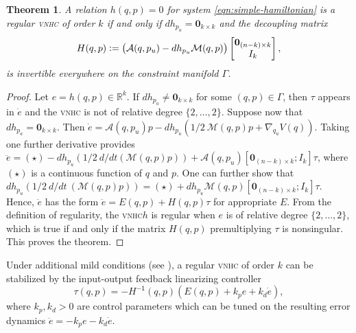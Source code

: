 \documentclass[journal,twoside,web, twocolumn,draftcls]{ieeecolor}
\newtheorem{thm}{Theorem}%
\newcommand*{\inv}{^\mathsf{-1}}
\newcommand*{\R}{\mathbb{R}}
\newcommand*{\Id}[1]{I_{#1}}
\newcommand*{\Zmat}[1]{\bm{0}_{#1}}
\newcommand*{\simpleB}{\begin{bmatrix}\Zmat{(n-k)\times k}\\ \Id{k}\end{bmatrix}}
\newcommand*{\eqdef}{\vcentcolon=}
\newcommand*{\vnhc}{\textsc{vnhc}\xspace}
\begin{document}
\begin{thm}\label{thm:vnhc-regularity}
    A relation \(h(q,p) = 0\) for system \eqref{eqn:simple-hamiltonian}
    is a regular \vnhc of order \(k\) if and only if 
    \(dh_{p_a} = \Zmat{k \times k}\) 
    and the decoupling matrix
    \begin{equation}\label{eqn:decoupling-matrix}
        H(q,p) \eqdef \big(\mathcal{A}(q,p_u) - dh_{p_u}\mathcal{M}(q,p)\big)\simpleB
         ,
     \end{equation}
    is invertible everywhere on the constraint manifold \(\Gamma\).
\end{thm}
\begin{proof}
    Let \(e = h(q,p) \in \R^k\).
    If \(dh_{p_a} \neq \Zmat{k\times k}\) for some \((q,p) \in \Gamma\), 
    then \(\tau\) appears in \(\dot{e}\) and the \vnhc is not of relative degree
    \(\{2,\ldots,2\}\). Suppose now that \(dh_{p_a} = \Zmat{k\times k}\).
    Then 
    \(\dot{e} = \mathcal{A}(q,p_u)p - 
     dh_{p_u}\left(1/2~\mathcal{M}(q,p)p + \nabla_{q_u}V(q)\right)\).
    Taking one further derivative provides
    \( \ddot{e} = (\star) - 
        dh_{p_u}\left(1/2~d/dt\left(\mathcal{M}(q,p)p\right)\right) 
        + \mathcal{A}(q,p_u)[\Zmat{(n-k)\times k};\Id{k}] \tau\),
    where \((\star)\) is a continuous function of \(q\) and \(p\).
    One can further show that
    \(dh_{p_u}\left(1/2~d/dt~\left(\mathcal{M}(q,p)p\right)\right)
        = (\star) + dh_{p_u}\mathcal{M}(q,p)[\Zmat{(n-k)\times k};
        \Id{k}]\tau\).
    Hence, $\ddot e$ has the form \( \ddot{e} = E(q,p) + H(q,p)\tau\) for appropriate \(E\).
    From the definition of regularity, the \vnhc \(h\) is regular 
    when \(e\) is of relative degree \(\{2,\ldots,2\}\), which is true 
    if and only if the matrix $H(q,p)$ premultiplying \(\tau\) is nonsingular. This proves the theorem.
\end{proof}

Under additional mild conditions (see \cite{vhcs_for_el_systems}),  a regular \vnhc of
order \(k\) can be  stabilized by the input-output feedback linearizing
controller
\begin{equation}\label{eqn:stabilizing-controller}
    \tau(q,p) = -H\inv(q,p)\left(E(q,p) + k_p e + k_d \dot{e}\right)
    ,
\end{equation}
where \(k_p, k_d > 0\) are control parameters which can be tuned on the
resulting error dynamics \(\ddot{e} = -k_p e - k_d \dot{e}\).
\end{document}
